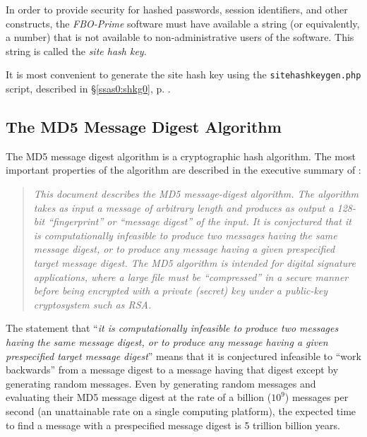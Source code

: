\documentclass[letterpaper,10pt,titlepage]{article}
\newcommand{\productbasename}{FBO-Prime}
\begin{document}
In order to provide security for hashed passwords, session identifiers,
and other constructs, the 
\emph{\productbasename{}} software must have available a string (or equivalently, a number)
that is not available to non-administrative users of the software.  This string
is called the \emph{site hash key}.

It is most convenient to generate the site hash key using the \texttt{sitehashkeygen.php}
script, described in \S{}\ref{ssas0:shkg0}, p. \pageref{ssas0:shkg0}.


\subsection{The MD5 Message Digest Algorithm}
\label{stbg0:smdf0}

The MD5 message digest algorithm
\cite{bibref:rfc1321} is a cryptographic hash algorithm.  The most important
properties of the algorithm are described in the executive summary of 
\cite{bibref:rfc1321}:

\begin{quote}
\emph{This document describes the MD5 message-digest algorithm. The
algorithm takes as input a message of arbitrary length and produces
as output a 128-bit ``fingerprint'' or ``message digest'' of the input.
It is conjectured that it is computationally infeasible to produce
two messages having the same message digest, or to produce any
message having a given prespecified target message digest. The MD5
algorithm is intended for digital signature applications, where a
large file must be ``compressed'' in a secure manner before being
encrypted with a private (secret) key under a public-key cryptosystem
such as RSA.}
\end{quote}

The statement that ``\emph{it is computationally infeasible to produce
two messages having the same message digest, or to produce any message having
a given prespecified target message digest}'' means
that it is conjectured infeasible to ``work backwards'' from 
a message digest to a message having that digest except by generating
random messages.  Even by generating random messages and 
evaluating their MD5 message digest at the rate of a billion ($10^9$) messages
per second (an unattainable rate on a single computing platform), the expected time
to find a message with a prespecified message digest is 5 trillion billion years.
\end{document}
